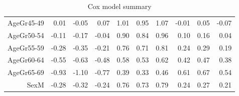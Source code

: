 \begin{table}[ht]
\begin{tabular}{rrrrrrrrrr}
  AgeGr45-49 & 0.01 & -0.05 & 0.07 & 1.01 & 0.95 & 1.07 & -0.01 & 0.05 & -0.07 \\ 
  AgeGr50-54 & -0.11 & -0.17 & -0.04 & 0.90 & 0.84 & 0.96 & 0.10 & 0.16 & 0.04 \\ 
  AgeGr55-59 & -0.28 & -0.35 & -0.21 & 0.76 & 0.71 & 0.81 & 0.24 & 0.29 & 0.19 \\ 
  AgeGr60-64 & -0.55 & -0.63 & -0.48 & 0.58 & 0.53 & 0.62 & 0.42 & 0.47 & 0.38 \\ 
  AgeGr65-69 & -0.93 & -1.10 & -0.77 & 0.39 & 0.33 & 0.46 & 0.61 & 0.67 & 0.54 \\ 
  SexM & -0.28 & -0.32 & -0.24 & 0.76 & 0.73 & 0.79 & 0.24 & 0.27 & 0.21 \\ 
   \hline
\end{tabular}
\caption{Cox model summary} 
\end{table}
